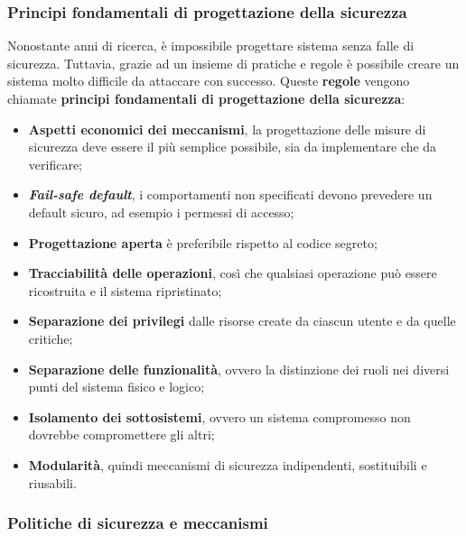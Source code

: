\documentclass[a4paper]{article}
\begin{document}
	\subsubsection{Principi fondamentali di progettazione della sicurezza}
	
	Nonostante anni di ricerca, è impossibile progettare sistema senza falle di sicurezza. Tuttavia, grazie ad un insieme di pratiche e regole è possibile creare un sistema molto difficile da attaccare con successo. Queste \textbf{regole} vengono chiamate \textcolor{Red3}{\textbf{principi fondamentali di progettazione della sicurezza}}:
	\begin{itemize}
		\item \textbf{Aspetti economici dei meccanismi}, la progettazione delle misure di sicurezza deve essere il più semplice possibile, sia da implementare che da verificare;
		
		\item \textbf{\emph{Fail-safe default}}, i comportamenti non specificati devono prevedere un default sicuro, ad esempio i permessi di accesso;
		
		\item \textbf{Progettazione aperta} è preferibile rispetto al codice segreto;
		
		\item \textbf{Tracciabilità delle operazioni}, così che qualsiasi operazione può essere ricostruita e il sistema ripristinato;
		
		\item \textbf{Separazione dei privilegi} dalle risorse create da ciascun utente e da quelle critiche;
		
		\item \textbf{Separazione delle funzionalità}, ovvero la distinzione dei ruoli nei diversi punti del sistema fisico e logico;
		
		\item \textbf{Isolamento dei sottosistemi}, ovvero un sistema compromesso non dovrebbe compromettere gli altri;
		
		\item \textbf{Modularità}, quindi meccanismi di sicurezza indipendenti, sostituibili e riusabili.
	\end{itemize}\newpage
	
	\subsubsection{Politiche di sicurezza e meccanismi}
	
\end{document}
